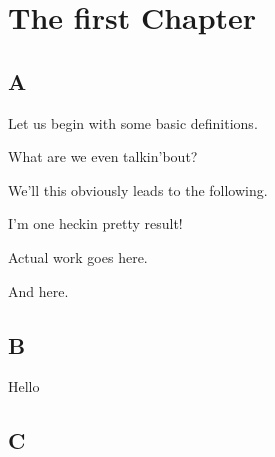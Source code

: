 \chapter{The first Chapter}\label{ch:One}
\section{A}
Let us begin with some basic definitions.
\begin{definition}
What are we even talkin'bout?
\end{definition}
We'll this obviously leads to the following.
\begin{theorem}
I'm one heckin pretty result!
\end{theorem}
\begin{lemma}
Actual work goes here.
\end{lemma}
\begin{lemma}
And here.
\end{lemma}

\section{B}
Hello
\section{C}